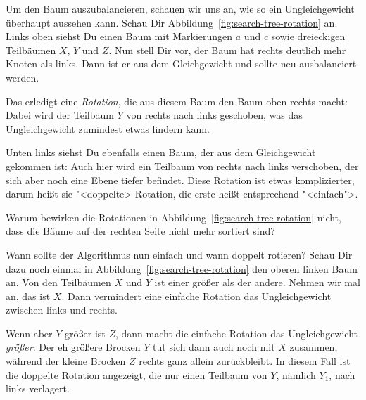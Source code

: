 Um den Baum auszubalancieren, schauen wir uns an, wie so ein
Ungleichgewicht überhaupt aussehen kann.  Schau Dir
Abbildung~\ref{fig:search-tree-rotation} an.  Links oben siehst Du einen
Baum mit Markierungen $a$ und $c$ sowie dreieckigen Teilbäumen $X$,
$Y$ und $Z$.  Nun stell Dir vor, der Baum hat rechts deutlich mehr
Knoten als links.  Dann ist er aus dem Gleichgewicht und sollte neu
ausbalanciert werden.

Das erledigt eine \textit{Rotation},
die aus diesem Baum den Baum oben rechts macht: Dabei wird der
Teilbaum $Y$ von rechts nach links geschoben, was das Ungleichgewicht
zumindest etwas lindern kann.

Unten links siehst Du ebenfalls einen Baum, der aus dem Gleichgewicht
gekommen ist: Auch hier wird ein Teilbaum von rechts nach links
verschoben, der sich aber noch eine Ebene tiefer befindet.  Diese
Rotation ist etwas komplizierter, darum heißt sie "<doppelte>
Rotation, die erste heißt entsprechend "<einfach">.

\begin{aufgabeinline}
  Warum bewirken die Rotationen in
  Abbildung~\ref{fig:search-tree-rotation} nicht, dass die Bäume auf
  der rechten Seite nicht mehr sortiert sind?
\end{aufgabeinline}

Wann sollte der Algorithmus nun einfach und wann doppelt rotieren?
Schau Dir dazu noch einmal in Abbildung~\ref{fig:search-tree-rotation}
den oberen linken Baum an.  Von den Teilbäumen $X$ und $Y$ ist einer
größer als der andere.  Nehmen wir mal an, das ist $X$.  Dann
vermindert eine einfache Rotation das Ungleichgewicht zwischen links
und rechts.

Wenn aber $Y$ größer ist $Z$, dann macht die einfache Rotation das
Ungleichgewicht \emph{größer}: Der eh größere Brocken $Y$ tut sich
dann auch noch mit $X$ zusammen, während der kleine Brocken $Z$ rechts
ganz allein zurückbleibt.  In diesem Fall ist die doppelte Rotation
angezeigt, die nur einen Teilbaum von $Y$, nämlich $Y_1$, nach links
verlagert.

